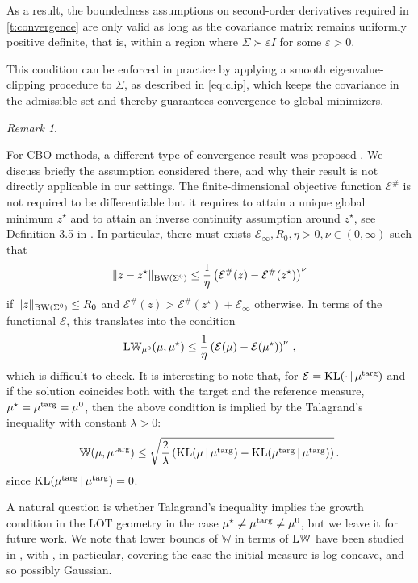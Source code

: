 \documentclass{article}
\theoremstyle{plain}
\theoremstyle{definition}
\theoremstyle{remark}
\newtheorem{remark}[theorem]{Remark}
\newcommand{\E}{\mathcal{E}}
\newcommand{\W}{\mathbb{W}}
\newcommand{\KL}{\textup{KL}}
\newcommand{\LW}{\textup{L}\mathbb{W}}
\newcommand{\targ}{\textup{targ}}
\newcommand{\rev}{}
\begin{document}
As a result, the boundedness assumptions on second-order derivatives required in \cref{t:convergence} are only valid as long as the covariance matrix remains uniformly positive definite, that is, within a region where $\Sigma \succ \varepsilon I$ for some $\varepsilon>0$.

This condition can be enforced in practice by applying a smooth eigenvalue-clipping procedure to $\Sigma$, as described in \eqref{eq:clip}, which keeps the covariance in the admissible set and thereby guarantees convergence to global minimizers.



\begin{remark} \label{rmk:fornasier}

For CBO methods, a different type of convergence result was proposed \cite{fornasier2024consensusbased}. We discuss briefly the assumption considered there, and
why their result is not directly applicable in our settings. The finite-dimensional objective function $\E^\#$ is not required to be differentiable but it requires to attain a unique global minimum $z^\star$ and to attain an inverse continuity assumption around $z^\star$, see Definition 3.5 in  \cite{fornasier2024consensusbased}. In particular, there must exists $\E_\infty, R_0, \eta>0, \nu \in(0,\infty)$ such that
\[
\|z - z^\star \|_{\textup{BW}(\Sigma^0)} \leq \frac1\eta \left( \E^\#(z) - \E^\#(z^\star)\right)^{\nu}
\]
if $\|z\|_{\textup{BW}(\Sigma^0)} \leq R_0$ and $\E^\#(z) > \E^\#(z^\star) + \E_\infty$ otherwise. In terms of the functional $\E$, this translates into the condition 
\[
\LW_{\mu^0}(\mu, \mu^\star) \leq  \frac1\eta \left( \E(\mu) - \E(\mu^\star)\right)^{\nu}\,,
\]
which is difficult to check.
It is interesting to note that, for $\E = \KL(\cdot\, | \, \mu^\targ)$ and if the solution coincides both with the target and the reference measure,  $\mu^\star = \mu^\targ = \mu^0$, then the above condition is implied by the 
Talagrand’s inequality \cite{otto2000talagrand} with constant $\lambda>0$:
\[
\W(\mu, \mu^\textup{targ}) \le \sqrt{\frac{2}{\lambda} \left( \KL(\mu \,|\, \mu^{\textup{targ}}) - \KL(\mu^{\textup{targ}} \,|\, \mu^{\textup{targ}}) \right)}\,.
\]
since $\KL(\mu^{\textup{targ}} \,|\, \mu^{\textup{targ}}) =0$.

A natural question is whether Talagrand’s inequality implies the growth condition in the LOT geometry in the case $\mu^\star \neq \mu ^\targ \neq \mu^0$, \rev{but we leave it for future work. We note that} lower bounds of $\W$ in terms of $\LW$ have been studied in \rev{\cite{delalande2023stability,carlier2024stability,letrouit2025gluing}, with \cite{letrouit2025gluing}, in particular, covering the case the initial measure is log-concave, and so possibly Gaussian.}
\end{remark}
\end{document}
